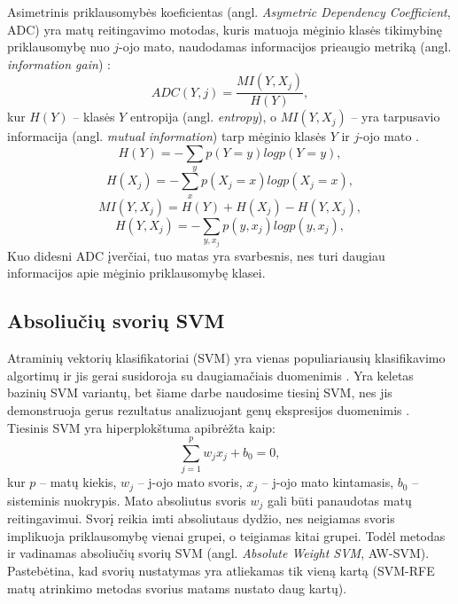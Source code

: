 Asimetrinis priklausomybės koeficientas (angl. \textit{Asymetric Dependency Coefficient}, ADC) yra matų reitingavimo motodas, kuris matuoja mėginio klasės tikimybinę priklausomybę nuo $j$-ojo mato, naudodamas informacijos prieaugio metriką (angl. \textit{information gain}) \cite{Shannon:2001:MTC:584091.584093}:
\begin{equation}
 ADC(Y, j) = \frac{MI(Y, X_j)}{H(Y)},
\end{equation}
kur $H(Y)$ -- klasės $Y$ entropija (angl. \textit{entropy}), o $MI(Y, X_j)$ -- yra tarpusavio informacija (angl. \textit{mutual information}) tarp mėginio klasės $Y$ ir $j$-ojo mato \cite{kent1983information}.
\begin{equation}
 H(Y)=-\sum_y{p(Y=y)log{p(Y=y)}}, 
\end{equation}
\begin{equation}
 H(X_j)=-\sum_x{p(X_j=x) log{p(X_j=x)}},
\end{equation}
\begin{equation}
 MI(Y, X_j) = H(Y) + H(X_j) - H(Y, X_j),
\end{equation}
\begin{equation}
 H(Y, X_j) = -\sum_{y,x_j}{p(y, x_j)log{p(y, x_j)}},
\end{equation}
Kuo didesni ADC įverčiai, tuo matas yra svarbesnis, nes turi daugiau informacijos apie mėginio priklausomybę klasei.

\subsection{Absoliučių svorių SVM}

Atraminių vektorių klasifikatoriai (SVM) yra vienas populiariausių klasifikavimo algortimų ir jis gerai susidoroja su daugiamačiais duomenimis \cite{guyon2002gene}. Yra keletas bazinių SVM variantų, bet šiame darbe naudosime tiesinį SVM, nes jis demonstruoja gerus rezultatus analizuojant genų ekspresijos duomenimis \cite{vapnik2000nature}. Tiesinis SVM yra hiperplokštuma apibrėžta kaip:
\begin{equation}
 \sum_{j=1}^{p}{w_jx_j + b_0 = 0},
\end{equation}
kur $p$ -- matų kiekis, $w_j$ -- j-ojo mato svoris, $x_j$ -- j-ojo mato kintamasis, $b_0$ -- sisteminis nuokrypis. Mato absoliutus svoris $w_j$ gali būti panaudotas
matų reitingavimui. Svorį reikia imti absoliutaus dydžio, nes neigiamas svoris implikuoja priklausomybę vienai grupei, o teigiamas kitai grupei. Todėl metodas ir vadinamas absoliučių svorių SVM (angl. \textit{Absolute Weight SVM}, AW-SVM). Pastebėtina, kad svorių nustatymas yra atliekamas tik vieną kartą (SVM-RFE matų atrinkimo metodas svorius matams nustato daug kartų).

